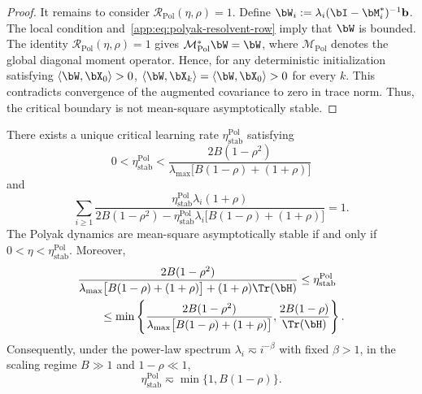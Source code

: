 \begin{proof}
It remains to consider
\(\mathcal R_{\mathrm{Pol}}(\eta,\rho)=1\). Define
\(\bW_i:=\lambda_i(\bI-\bM_i^*)^{-1}\mathbf b\).
The local condition and~\eqref{app:eq:polyak-resolvent-row} imply that
\(\bW\) is bounded. The identity
\(\mathcal R_{\mathrm{Pol}}(\eta,\rho)=1\) gives
\(\mathcal M_{\mathrm{Pol}}^*\bW=\bW\), where
\(\mathcal M_{\mathrm{Pol}}\) denotes the global diagonal moment operator. Hence, for any deterministic initialization satisfying
\(\langle\bW,\bX_0\rangle>0\),
\(\langle\bW,\bX_k\rangle
=\langle\bW,\bX_0\rangle>0\) for every \(k\). This contradicts convergence of the augmented covariance to zero in trace norm. Thus, the critical boundary is not mean-square asymptotically stable.
\end{proof}

\begin{corollary}
\label{app:cor:polyak-critical-learning-rate}
There exists a unique critical learning rate
\(\eta_{\mathrm{stab}}^{\mathrm{Pol}}\) satisfying
\[
0
<
\eta_{\mathrm{stab}}^{\mathrm{Pol}}
<
\frac{2B(1-\rho^2)}
{\lambda_{\max}\big[B(1-\rho)+(1+\rho)\big]}
\]
and
\begin{equation}
\label{app:eq:polyak-critical-equation}
\sum_{i\geq1}
\frac{
\eta_{\mathrm{stab}}^{\mathrm{Pol}}\lambda_i(1+\rho)
}{
2B(1-\rho^2)
-
\eta_{\mathrm{stab}}^{\mathrm{Pol}}\lambda_i
\big[B(1-\rho)+(1+\rho)\big]
}
=
1.
\end{equation}
The Polyak dynamics are mean-square asymptotically stable if and only if
\(0<\eta<\eta_{\mathrm{stab}}^{\mathrm{Pol}}\). Moreover,
\begin{align}
&\frac{2B(1-\rho^2)}
{\lambda_{\max}\big[B(1-\rho)+(1+\rho)\big]+(1+\rho)\Tr(\bH)}
\leq
\eta_{\mathrm{stab}}^{\mathrm{Pol}}
\nonumber\\
&\qquad\leq
\min\left\{
\frac{2B(1-\rho^2)}
{\lambda_{\max}\big[B(1-\rho)+(1+\rho)\big]},
\frac{2B(1-\rho)}{\Tr(\bH)}
\right\}.
\label{app:eq:polyak-critical-bounds}
\end{align}
Consequently, under the power-law spectrum
\(\lambda_i\eqsim i^{-\beta}\) with fixed \(\beta>1\), in the scaling regime \(B\gg1\) and \(1-\rho\ll1\),
\[
\eta_{\mathrm{stab}}^{\mathrm{Pol}}
\eqsim
\min\{1,B(1-\rho)\}.
\]
\end{corollary}

